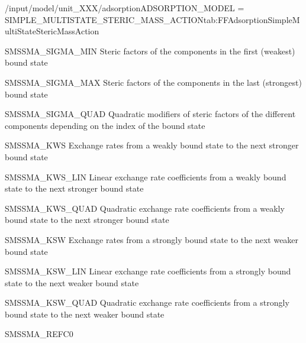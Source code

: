 \begin{condsubgroup}{/input/model/unit\_XXX/adsorption}{ADSORPTION\_MODEL = SIMPLE\_MULTISTATE\_STERIC\_MASS\_ACTION}{tab:FFAdsorptionSimpleMultiStateStericMassAction}
\begin{dataset}[type = double, range={$\geq 0$}, length={\texttt{NCOMP}}]{SMSSMA\_SIGMA\_MIN}
    Steric factors of the components in the first (weakest) bound state
  \end{dataset} 
  \begin{dataset}[type = double, range={$\geq 0$}, length={\texttt{NCOMP}}]{SMSSMA\_SIGMA\_MAX} 
    Steric factors of the components in the last (strongest) bound state
  \end{dataset} 
  \begin{dataset}[type = double, range={$\mathds{R}$}, length={\texttt{NCOMP}}]{SMSSMA\_SIGMA\_QUAD} 
    Quadratic modifiers of steric factors of the different components depending on the index of the bound state
  \end{dataset} 
  \begin{dataset}[unit=\si{\per\second}, type = double, range={$\geq 0$}, length={\texttt{NCOMP}}]{SMSSMA\_KWS} 
    Exchange rates from a weakly bound state to the next stronger bound state
  \end{dataset} 
  \begin{dataset}[unit=\si{\per\second}, type = double, range={$\mathds{R}$}, length={\texttt{NCOMP}}]{SMSSMA\_KWS\_LIN} 
    Linear exchange rate coefficients from a weakly bound state to the next stronger bound state
  \end{dataset} 
  \begin{dataset}[unit=\si{\per\second}, type = double, range={$\mathds{R}$}, length={\texttt{NCOMP}}]{SMSSMA\_KWS\_QUAD} 
    Quadratic exchange rate coefficients from a weakly bound state to the next stronger bound state
  \end{dataset} 
  \begin{dataset}[unit=\si{\per\second}, type = double, range={$\geq 0$}, length={\texttt{NCOMP}}]{SMSSMA\_KSW} 
    Exchange rates from a strongly bound state to the next weaker bound state
  \end{dataset} 
  \begin{dataset}[unit=\si{\per\second}, type = double, range={$\mathds{R}$}, length={\texttt{NCOMP}}]{SMSSMA\_KSW\_LIN} 
    Linear exchange rate coefficients from a strongly bound state to the next weaker bound state
  \end{dataset} 
  \begin{dataset}[unit=\si{\per\second}, type = double, range={$\mathds{R}$}, length={\texttt{NCOMP}}]{SMSSMA\_KSW\_QUAD} 
    Quadratic exchange rate coefficients from a strongly bound state to the next weaker bound state
  \end{dataset} 
  \begin{dataset}[unit=\si{\mol\per\raiseto{3}\metre\of{MP}}, type = double, range={$> 0$}, length={1}]{SMSSMA\_REFC0} 

\end{dataset}
\end{condsubgroup}

